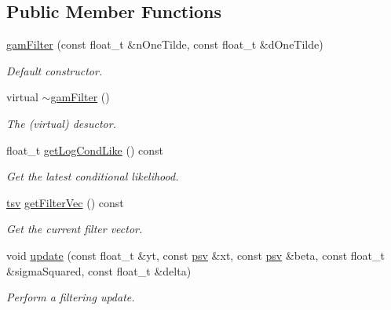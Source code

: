 \subsection*{Public Member Functions}
\begin{DoxyCompactItemize}
\item 
\hyperlink{classgamFilter_af412e3430594dafd0779363c1664d5f8}{gam\+Filter} (const float\+\_\+t \&n\+One\+Tilde, const float\+\_\+t \&d\+One\+Tilde)
\begin{DoxyCompactList}\small\item\em Default constructor. \end{DoxyCompactList}\item 
\mbox{\label{classgamFilter_af4f4009a88b82bb277f6ea9012fef940}} 
virtual \hyperlink{classgamFilter_af4f4009a88b82bb277f6ea9012fef940}{$\sim$gam\+Filter} ()
\begin{DoxyCompactList}\small\item\em The (virtual) desuctor. \end{DoxyCompactList}\item 
float\+\_\+t \hyperlink{classgamFilter_a8849fcc87e594367865c14767b8849e8}{get\+Log\+Cond\+Like} () const
\begin{DoxyCompactList}\small\item\em Get the latest conditional likelihood. \end{DoxyCompactList}\item 
\hyperlink{classgamFilter_ab8cbe50cc21d9a9474c0e2b9b45a6162}{tsv} \hyperlink{classgamFilter_a1e76b015d5319ab1ce188848b525927a}{get\+Filter\+Vec} () const
\begin{DoxyCompactList}\small\item\em Get the current filter vector. \end{DoxyCompactList}\item 
void \hyperlink{classgamFilter_af6a33d3fb634803c3b54521defb15b28}{update} (const float\+\_\+t \&yt, const \hyperlink{classgamFilter_ae43550158ad06de3a1829d5cb491b3fc}{psv} \&xt, const \hyperlink{classgamFilter_ae43550158ad06de3a1829d5cb491b3fc}{psv} \&beta, const float\+\_\+t \&sigma\+Squared, const float\+\_\+t \&delta)
\begin{DoxyCompactList}\small\item\em Perform a filtering update. \end{DoxyCompactList}\end{DoxyCompactItemize}
